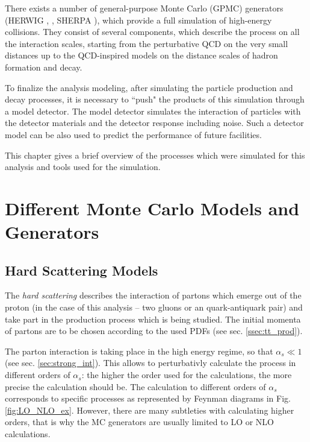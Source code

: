 There exists a number of general-purpose Monte Carlo (GPMC) generators (HERWIG \cite{Corcella:2000bw},  \cite{Sjostrand:2006za}, 
SHERPA \cite{Gleisberg:2003xi}), which provide a full simulation of high-energy collisions. They consist of several components,
which describe the process on all the interaction scales, starting from the perturbative QCD on the very small distances up to
the QCD-inspired models on the distance scales of hadron formation and decay. 

To finalize the analysis modeling, after simulating the particle production and decay processes, it is necessary 
to ``push" the products of this simulation through a model detector. The model detector simulates the interaction of particles 
with the detector materials and the detector response including noise. Such a detector model can be also used to predict the performance 
of future facilities.

This chapter gives a brief overview of the processes which were simulated for this analysis and tools used for 
the simulation.

\section{Different Monte Carlo Models and Generators}
\subsection{Hard Scattering Models}

The \textit{hard scattering} describes the interaction of partons which emerge out of the proton (in the case of this analysis 
-- two gluons or an quark-antiquark pair) and take part in the production process which is being studied. The initial momenta 
of partons are to be chosen according to the used PDFs (see sec. \ref{ssec:tt_prod}).

The parton interaction is taking place in the high energy regime, so that $\alpha_{s} \ll 1$ (see sec. \ref{sec:strong_int}). 
This allows to perturbativly calculate the process in different orders of $\alpha_{s}$: the higher the order used
for the calculations, the more precise the calculation should be. The calculation to different orders of $\alpha_{s}$ corresponds
to specific processes as represented by Feynman diagrams in Fig.\ref{fig:LO_NLO_ex}. However, there are many subtleties with 
calculating higher orders, that is why the MC generators are usually limited to LO or NLO calculations.

